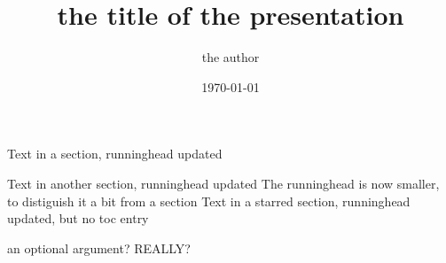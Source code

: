 \documentclass[english]{komapresentation}
\author{the author}
\title{the title of the presentation}
\date{\today}
\begin{document}
\tableofcontents
{}
Text in a section, runninghead updated

Text in another section, runninghead updated
The runninghead is now smaller, to distiguish it a bit from a
section
Text in a starred section, runninghead updated, but no toc entry

an optional argument? REALLY?
\end{document}
